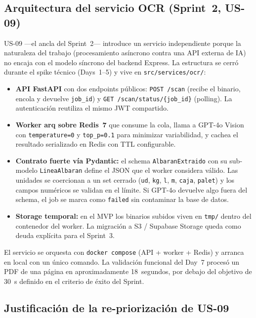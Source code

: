 \subsection{Arquitectura del servicio OCR (Sprint~2, US-09)}

US-09 ---el ancla del Sprint~2--- introduce un servicio independiente porque la naturaleza del trabajo (procesamiento asíncrono contra una API externa de IA) no encaja con el modelo síncrono del backend Express. La estructura se cerró durante el spike técnico (Days~1--5) y vive en \texttt{src/services/ocr/}:

\begin{itemize}
\item \textbf{API FastAPI} con dos endpoints públicos: \texttt{POST /scan} (recibe el binario, encola y devuelve \texttt{job\_id}) y \texttt{GET /scan/status/\{job\_id\}} (polling). La autenticación reutiliza el mismo JWT compartido.
\item \textbf{Worker arq sobre Redis~7} que consume la cola, llama a GPT-4o Vision con \texttt{temperature=0} y \texttt{top\_p=0.1} para minimizar variabilidad, y cachea el resultado serializado en Redis con TTL configurable.
\item \textbf{Contrato fuerte vía Pydantic:} el schema \texttt{AlbaranExtraido} con su sub-modelo \texttt{LineaAlbaran} define el JSON que el worker considera válido. Las unidades se coercionan a un set cerrado (\texttt{ud}, \texttt{kg}, \texttt{l}, \texttt{m}, \texttt{caja}, \texttt{palet}) y los campos numéricos se validan en el límite. Si GPT-4o devuelve algo fuera del schema, el job se marca como \texttt{failed} sin contaminar la base de datos.
\item \textbf{Storage temporal:} en el MVP los binarios subidos viven en \texttt{tmp/} dentro del contenedor del worker. La migración a S3 / Supabase Storage queda como deuda explícita para el Sprint~3.
\end{itemize}

El servicio se orquesta con \texttt{docker compose} (API + worker + Redis) y arranca en local con un único comando. La validación funcional del Day~7 procesó un PDF de una página en aproximadamente 18~segundos, por debajo del objetivo de 30~s definido en el criterio de éxito del Sprint.

\subsection{Justificación de la re-priorización de US-09}

